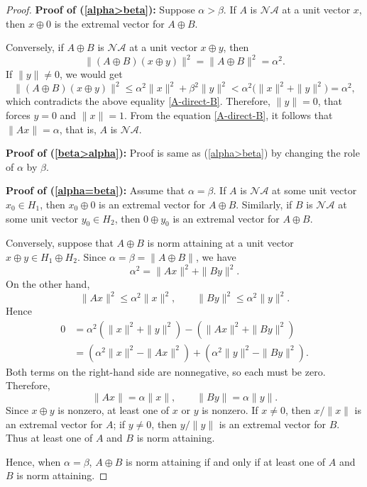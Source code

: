 \documentclass[12pt]{amsart}
\theoremstyle{definition}
\theoremstyle{remark}
\newcommand{\na}{\mathcal{NA}}
\numberwithin{equation}{section}
\begin{document}
\begin{proof}

\textbf{Proof of (\ref{alpha>beta}):} Suppose $\alpha>\beta$.  
If $A$ is $\na$ at a unit vector $x$, then $x\oplus 0$ is the extremal vector for $A\oplus B$. 

Conversely, if $A\oplus B$ is $\na$ at a unit vector $x\oplus y$, then
\begin{equation}\label{A-direct-B}
\|(A\oplus B)(x\oplus y)\|^2=\|A\oplus B\|^2=\alpha^2.
\end{equation}
If $\|y\|\neq 0$, we would get
$$
\|(A\oplus B)(x\oplus y)\|^2\le \alpha^2\|x\|^2+\beta^2\|y\|^2
< \alpha^2\big(\|x\|^2+\|y\|^2\big)=\alpha^2,
$$
which contradicts the above equality \eqref{A-direct-B}. Therefore, $\|y\|=0$, that forces $y=0$ and $\|x\|=1$. From the equation \eqref{A-direct-B}, it follows that $\|Ax\|=\alpha$, that is, $A$ is $\na$.  

\textbf{Proof of (\ref{beta>alpha}):} Proof is same as (\ref{alpha>beta}) by changing the role of $\alpha$ by $\beta$.


\textbf{Proof of (\ref{alpha=beta}):}
Assume that $\alpha=\beta$. If $A$ is $\na$ at some unit vector
$x_0\in H_1$, then $x_0\oplus0$ is an extremal vector for
$A\oplus B$. Similarly, if $B$ is $\na$ at some unit vector
$y_0\in H_2$, then $0\oplus y_0$ is an extremal vector for
$A\oplus B$.

Conversely, suppose that $A\oplus B$ is norm attaining at a unit
vector $x\oplus y\in H_1\oplus H_2$. Since
$\alpha=\beta=\|A\oplus B\|$, we have
\[
\alpha^2
=
\|Ax\|^2+\|By\|^2.
\]
On the other hand,
\[
\|Ax\|^2\leq\alpha^2\|x\|^2,
\qquad
\|By\|^2\leq\alpha^2\|y\|^2.
\]
Hence
\[
\begin{aligned}
0&=\alpha^2(\|x\|^2+\|y\|^2)-\left(\|Ax\|^2+\|By\|^2\right)\\
	&=\left(\alpha^2\|x\|^2-\|Ax\|^2\right)+\left(\alpha^2\|y\|^2-\|By\|^2\right).
\end{aligned}
\]
Both terms on the right-hand side are nonnegative, so each must be
zero. Therefore,
\[
\|Ax\|=\alpha\|x\|,
\qquad
\|By\|=\alpha\|y\|.
\]
Since $x\oplus y$ is nonzero, at least one of $x$ or $y$ is nonzero.
If $x\neq0$, then $x/\|x\|$ is an extremal vector for $A$; if
$y\neq0$, then $y/\|y\|$ is an extremal vector for $B$. Thus at
least one of $A$ and $B$ is norm attaining.

Hence, when $\alpha=\beta$, $A\oplus B$ is norm attaining if and
only if at least one of $A$ and $B$ is norm attaining.

\end{proof}
\end{document}
